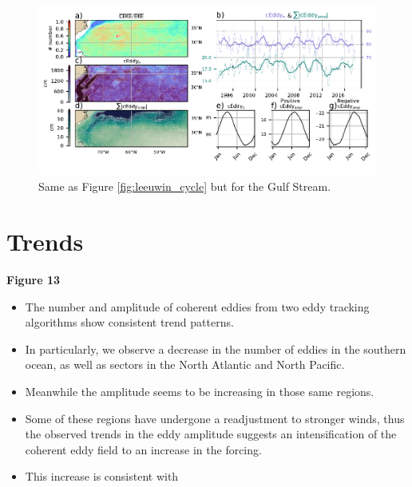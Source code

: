 \documentclass[draft,linenumbers]{agujournal2019}
\begin{document}
	\begin{figure}
	    \centering
	    \includegraphics[width=1\textwidth]{figures/regional_ratios_and_stats_V3_5.pdf}
	    \caption{Same as Figure \ref{fig:leeuwin_cycle} but for the Gulf Stream.}
	    \label{fig:south_atlantic_cycle}
	\end{figure}

	\section{Trends}
	\label{sec:CE_trends}

	\textbf{Figure 13}
	\begin{itemize}
		\item The number and amplitude of coherent eddies from two eddy tracking algorithms show consistent trend patterns. 
		\item In particularly, we observe a decrease in the number of eddies in the southern ocean, as well as sectors in the North Atlantic and North Pacific. 
		\item Meanwhile the amplitude seems to be increasing in those same regions. 
		\item Some of these regions have undergone a readjustment to stronger winds, thus the observed trends in the eddy amplitude suggests an intensification of the coherent eddy field to an increase in the forcing.
		\item This increase is consistent with \citet{Martinez_Kinetic_2021}
	\end{itemize}
\end{document}
